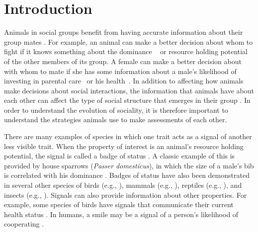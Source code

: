 \section*{Introduction} 
Animals in social groups benefit from having accurate information about their group mates \citep{Seyfarth:2010bh}. For example, an animal can make a better decision about whom to fight if it knows something about the dominance ~\citep{Waal:1986ys,Cowlishaw:1990vn,Bergman:2003qf,Seyfarth:2005ve,Flack:2006uq,Hobson:2015uq} or resource holding potential~\citep{Rhijn:1980uq,Freeman:1985kl,Dick:1990cr,Lemel:1993ve,Part:1997ys} of the other members of its group. A female can  make a better decision about with whom to mate if she has some information about a male's likelihood of investing in parental care~\citep{Qvarnstrom:1997fk,McGlothlin:2007au,Olsen:2010uq} or his health~\citep{Folstad:1992kx,Loyau:2005nx}. In addition to affecting how animals make decisions about social interactions, the information that animals have about each other can affect the type of social structure that emerges in their group \citep{Dugatkin:2004hz,Hobson:2015uq,Brush:2018ss}. In order to understand the evolution of sociality, it is therefore important to understand the strategies animals use to make assessments of each other.  

There are many examples of species in which one trait acts as a signal of another less visible trait. When the property of interest is an animal's resource holding potential, the signal is called a badge of status \citep{dawkins1978signals,Rohwer:1981vn,Rohwer:1982fk,Ripoll:2004vn,sheehan2016evotradeoff}. A classic example of this is provided by house sparrows (\emph{Passer domesticus}), in which the size of a male's bib is correlated with his dominance \citep{Veiga:1993fk,Veiga:1995ys}. Badges of status have also been demonstrated in several other species of birds (e.g., \citealp{Remy:2010fk,Olsen:2010uq,Lemel:1993ve,Tibbetts:2009kx}), mammals (e.g., \citealp{Gerald:2001zm}), reptiles (e.g., \citealp{Fox:1990hd}), and insects (e.g., \citealp{Tibbetts:2004kx}). Signals can also provide information about other properties. For example, some species of birds have signals that communicate their current health status \citep{Folstad:1992kx,Loyau:2005nx}. In humans, a smile may be a signal of a person's likelihood of cooperating \citep{Schug:2010be}.

